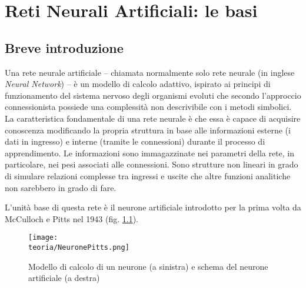 \chapter{Reti Neurali Artificiali: le basi} %
\label{Capitolo1} %
\def \path {Figures/C1}
\def \teoria {Figures/teoria}


\section{Breve introduzione}
\label{sec:intro}
Una rete neurale artificiale – chiamata normalmente solo rete neurale (in inglese \emph{Neural Network}) – è
un modello di calcolo adattivo, ispirato ai principi di funzionamento del sistema nervoso degli organismi evoluti che secondo l'approccio connessionista\parencite{WConnessionismo} possiede una complessità non descrivibile con i metodi simbolici.  
La caratteristica fondamentale di una rete neurale è che essa è capace di acquisire conoscenza modificando la propria struttura in base alle informazioni esterne (i dati in ingresso) e interne (tramite le connessioni) durante il processo di apprendimento. Le informazioni sono immagazzinate nei parametri della rete, in particolare, nei pesi associati alle connessioni. 
Sono strutture non lineari in grado di simulare relazioni complesse tra
ingressi e uscite che altre funzioni analitiche non sarebbero in grado di fare. 


L'unità base di questa rete è il neurone artificiale introdotto per la prima volta da McCulloch e
Pitts nel 1943 (fig. \ref{fig:neuron}).


\begin{figure}[h!]
 \centering
 \texttt{[image: \\teoria/NeuronePitts.png]}
 \caption{Modello di calcolo di un neurone (a sinistra) e schema del neurone artificiale (a destra)}
 \label{fig:neuron}
\end{figure}

